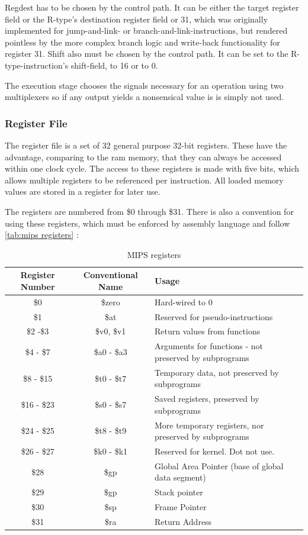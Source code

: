 Regdest has to be chosen by the control path. It can be either the target 
register field or the R-type's destination register field or 31, which was originally implemented for jump-and-link- or branch-and-link-instructions, but rendered pointless
by the more complex branch logic and write-back functionality for register 31. Shift also must be chosen by the control path. It can be set to the R-type-instruction's shift-field, 
to 16 or to 0. 

The execution stage chooses the signals necessary for an operation using two multiplexers so if any output yields a nonsensical value is is simply not used.

\subsubsection{Register File}
The register file is a set of 32 general purpose 32-bit registers. These have the advantage, comparing to the ram memory, that they can always be accessed within one clock cycle.
The access to these registers is made with five bits, which allows multiple registers to be referenced per instruction. All loaded memory values are stored in a register
for later use.

The registers are numbered from \$0 through \$31. There is also a convention for using these registers, which must be enforced by assembly language and follow \autoref{tab:mips registers} 
\cite{regfiles}:

\begin{table}[h!]
	\centering
	 \caption{MIPS registers}	
	\begin{tabular}{ccl}
		\toprule[2pt]
		\textbf{Register Number} & \textbf{Conventional Name} &\textbf{Usage}  \\
		\toprule[2pt]
		\$0 & \$zero & Hard-wired to 0 \\
		\$1 & \$at & Reserved for pseudo-instructions \\
		\$2 -\$3 & \$v0, \$v1 & Return values from functions \\
		\$4 - \$7 & \$a0 - \$a3 & Arguments for functions - not preserved by subprograms \\
		\$8 - \$15 & \$t0 - \$t7 & Temporary data, not preserved by subprograms \\
		\$16 - \$23 & \$s0 - \$s7 & Saved registers, preserved by subprograms \\
		\$24 - \$25 & \$t8 - \$t9 & More temporary registers, nor preserved by subprograms  \\
		\$26 - \$27 & \$k0 - \$k1  & Reserved for kernel. Dot not use. \\
		\$28 & \$gp & Global Area Pointer (base of global data segment) \\
		\$29 & \$gp & Stack pointer \\
		\$30 & \$sp & Frame Pointer \\
		\$31 & \$ra & Return Address \\
		\bottomrule[2pt]
	\end{tabular} 
	\label{tab:mips registers}
\end{table}

